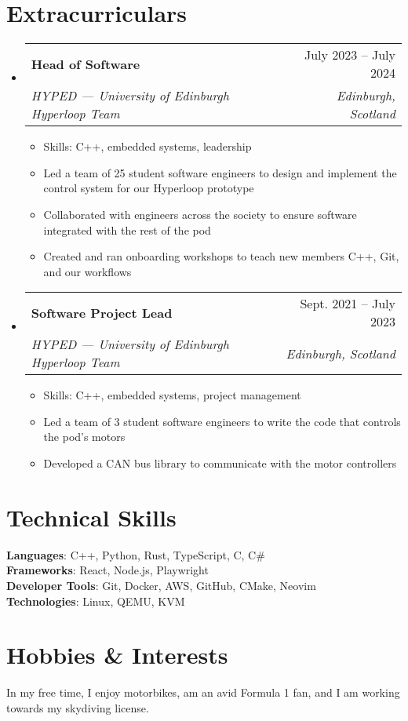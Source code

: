 \documentclass[letterpaper,11pt]{article}
\makeatletter
\newcommand{\resumeItem}[1]{
  \item\small{
    {#1 \vspace{-2pt}}
  }
}
\newcommand{\resumeSubheading}[4]{
  \vspace{-2pt}\item
    \begin{tabular*}{0.97\textwidth}[t]{l@{\extracolsep{\fill}}r}
      \textbf{#1} & #2 \\
      \textit{\small#3} & \textit{\small #4} \\
    \end{tabular*}\vspace{-7pt}
}
\newcommand{\resumeSubHeadingListStart}{\begin{itemize}[leftmargin=0.15in, label={}]}
\newcommand{\resumeSubHeadingListEnd}{\end{itemize}}
\newcommand{\resumeItemListStart}{\begin{itemize}}
\newcommand{\resumeItemListEnd}{\end{itemize}\vspace{-5pt}}
\makeatother
\begin{document}
\section{Extracurriculars}
  \resumeSubHeadingListStart

    \resumeSubheading
      {Head of Software}{July 2023 -- July 2024}
      {HYPED — University of Edinburgh Hyperloop Team}{Edinburgh, Scotland}
      \resumeItemListStart
        \resumeItem{Skills: C++, embedded systems, leadership}
        \resumeItem{Led a team of 25 student software engineers to design and implement the control system for our Hyperloop prototype}
        \resumeItem{Collaborated with engineers across the society to ensure software integrated with the rest of the pod}
        \resumeItem{Created and ran onboarding workshops to teach new members C++, Git, and our workflows}
      \resumeItemListEnd

    \resumeSubheading
      {Software Project Lead}{Sept. 2021 -- July 2023}
      {HYPED — University of Edinburgh Hyperloop Team}{Edinburgh, Scotland}
      \resumeItemListStart
        \resumeItem{Skills: C++, embedded systems, project management}
        \resumeItem{Led a team of 3 student software engineers to write the code that controls the pod's motors}
        \resumeItem{Developed a CAN bus library to communicate with the motor controllers}
    \resumeItemListEnd

  \resumeSubHeadingListEnd

\section{Technical Skills}
 \begin{itemize}[leftmargin=0.15in, label={}]
    \small{\item{
     \textbf{Languages}{: C++, Python, Rust, TypeScript, C, C\#} \\
     \textbf{Frameworks}{: React, Node.js, Playwright} \\
     \textbf{Developer Tools}{: Git, Docker, AWS, GitHub, CMake, Neovim} \\
     \textbf{Technologies}{: Linux, QEMU, KVM} \\
    }}
 \end{itemize}

\section{Hobbies \& Interests}
In my free time, I enjoy motorbikes, am an avid Formula 1 fan, and I am working towards my skydiving license.
\end{document}
